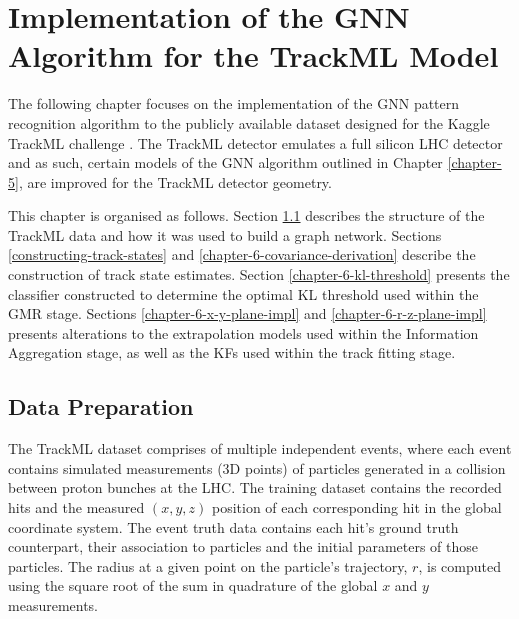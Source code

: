 


\chapter{Implementation of the GNN Algorithm for the TrackML Model}
\label{chapter-6}

The following chapter focuses on the implementation of the GNN pattern recognition algorithm to the publicly available dataset designed for the Kaggle TrackML challenge \cite{kaggle-trackml}. The TrackML detector emulates a full silicon LHC detector and as such, certain models of the GNN algorithm outlined in Chapter \ref{chapter-5}, are improved for the TrackML detector geometry.

This chapter is organised as follows. Section \ref{chapter-6-data-prep} describes the structure of the TrackML data and how it was used to build a graph network. Sections \ref{constructing-track-states} and \ref{chapter-6-covariance-derivation} describe the construction of track state estimates. Section \ref{chapter-6-kl-threshold} presents the classifier constructed to determine the optimal KL threshold used within the GMR stage. Sections \ref{chapter-6-x-y-plane-impl} and \ref{chapter-6-r-z-plane-impl} presents alterations to the extrapolation models used within the Information Aggregation stage, as well as the KFs used within the track fitting stage. 
 





\section{Data Preparation}
\label{chapter-6-data-prep}

The TrackML dataset \cite{kaggle-trackml-data} comprises of multiple independent events, where each event contains simulated measurements (3D points) of particles generated in a collision between proton bunches at the LHC. The training dataset contains the recorded hits and the measured $(x, y, z)$ position of each corresponding hit in the global coordinate system. The event truth data contains each hit's ground truth counterpart, their association to particles and the initial parameters of those particles. The radius at a given point on the particle's trajectory, $r$, is computed using the square root of the sum in quadrature of the global $x$ and $y$ measurements.

